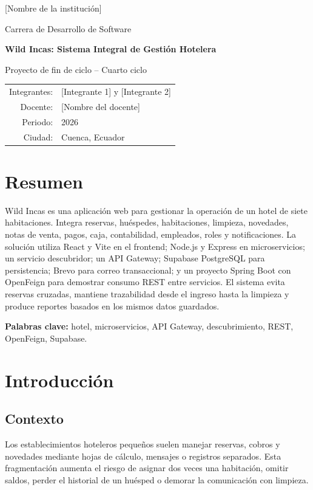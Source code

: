 \documentclass[12pt,a4paper]{article}
\newcommand{\proyecto}{Wild Incas: Sistema Integral de Gestión Hotelera}
\newcommand{\institucion}{[Nombre de la institución]}
\newcommand{\carrera}{Carrera de Desarrollo de Software}
\newcommand{\integrantes}{[Integrante 1] y [Integrante 2]}
\newcommand{\docente}{[Nombre del docente]}
\begin{document}
\begin{titlepage}
\centering
{\Large \institucion\par}
\vspace{1cm}
{\large \carrera\par}
\vspace{2cm}
{\Huge\bfseries \proyecto\par}
\vspace{1cm}
{\Large Proyecto de fin de ciclo -- Cuarto ciclo\par}
\vfill
\begin{tabular}{rl}
Integrantes: & \integrantes \\
Docente: & \docente \\
Periodo: & 2026 \\
Ciudad: & Cuenca, Ecuador
\end{tabular}
\vfill
\end{titlepage}

\tableofcontents
\newpage

\section{Resumen}

Wild Incas es una aplicación web para gestionar la operación de un hotel de siete habitaciones. Integra reservas, huéspedes, habitaciones, limpieza, novedades, notas de venta, pagos, caja, contabilidad, empleados, roles y notificaciones. La solución utiliza React y Vite en el frontend; Node.js y Express en microservicios; un servicio descubridor; un API Gateway; Supabase PostgreSQL para persistencia; Brevo para correo transaccional; y un proyecto Spring Boot con OpenFeign para demostrar consumo REST entre servicios. El sistema evita reservas cruzadas, mantiene trazabilidad desde el ingreso hasta la limpieza y produce reportes basados en los mismos datos guardados.

\textbf{Palabras clave:} hotel, microservicios, API Gateway, descubrimiento, REST, OpenFeign, Supabase.

\section{Introducción}

\subsection{Contexto}

Los establecimientos hoteleros pequeños suelen manejar reservas, cobros y novedades mediante hojas de cálculo, mensajes o registros separados. Esta fragmentación aumenta el riesgo de asignar dos veces una habitación, omitir saldos, perder el historial de un huésped o demorar la comunicación con limpieza.
\end{document}
